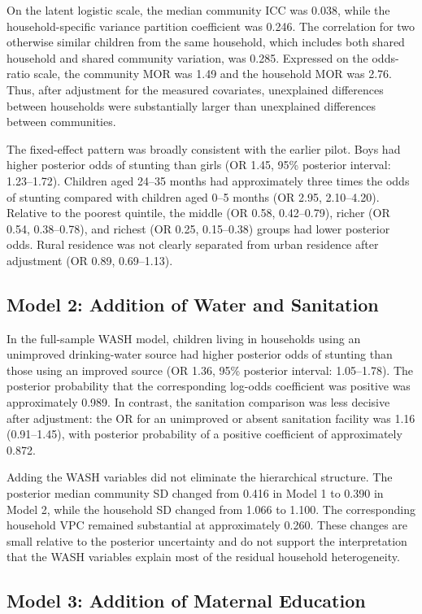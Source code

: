 On the latent logistic scale, the median community ICC was 0.038, while the household-specific variance partition coefficient was 0.246. The correlation for two otherwise similar children from the same household, which includes both shared household and shared community variation, was 0.285. Expressed on the odds-ratio scale, the community MOR was 1.49 and the household MOR was 2.76. Thus, after adjustment for the measured covariates, unexplained differences between households were substantially larger than unexplained differences between communities.

The fixed-effect pattern was broadly consistent with the earlier pilot. Boys had higher posterior odds of stunting than girls (OR 1.45, 95\% posterior interval: 1.23--1.72). Children aged 24--35 months had approximately three times the odds of stunting compared with children aged 0--5 months (OR 2.95, 2.10--4.20). Relative to the poorest quintile, the middle (OR 0.58, 0.42--0.79), richer (OR 0.54, 0.38--0.78), and richest (OR 0.25, 0.15--0.38) groups had lower posterior odds. Rural residence was not clearly separated from urban residence after adjustment (OR 0.89, 0.69--1.13).

\subsection{Model 2: Addition of Water and Sanitation}

In the full-sample WASH model, children living in households using an unimproved drinking-water source had higher posterior odds of stunting than those using an improved source (OR 1.36, 95\% posterior interval: 1.05--1.78). The posterior probability that the corresponding log-odds coefficient was positive was approximately 0.989. In contrast, the sanitation comparison was less decisive after adjustment: the OR for an unimproved or absent sanitation facility was 1.16 (0.91--1.45), with posterior probability of a positive coefficient of approximately 0.872.

Adding the WASH variables did not eliminate the hierarchical structure. The posterior median community SD changed from 0.416 in Model 1 to 0.390 in Model 2, while the household SD changed from 1.066 to 1.100. The corresponding household VPC remained substantial at approximately 0.260. These changes are small relative to the posterior uncertainty and do not support the interpretation that the WASH variables explain most of the residual household heterogeneity.

\subsection{Model 3: Addition of Maternal Education}

